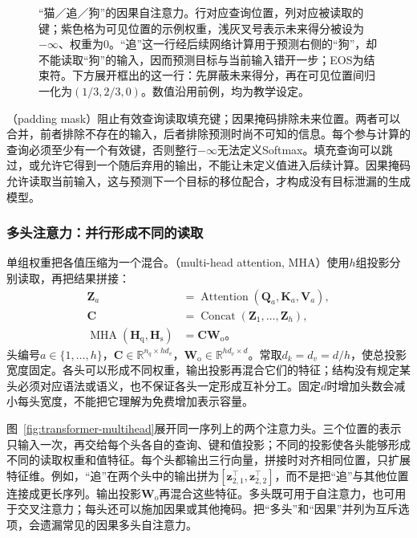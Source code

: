 \begin{figure}[htbp]
  \centering
  
  \caption{“猫／追／狗”的因果自注意力。行对应查询位置，列对应被读取的键；紫色格为可见位置的示例权重，浅灰叉号表示未来得分被设为$-\infty$、权重为0。“追”这一行经后续网络计算用于预测右侧的“狗”，却不能读取“狗”的输入，因而预测目标与当前输入错开一步；EOS为结束符。下方展开框出的这一行：先屏蔽未来得分，再在可见位置间归一化为$(1/3,2/3,0)$。数值沿用前例，均为教学设定。}
  \label{fig:transformer-causal-attention}
\end{figure}
\FloatBarrier
{}（padding mask）阻止有效查询读取填充键；因果掩码排除未来位置。两者可以合并，前者排除不存在的输入，后者排除预测时尚不可知的信息。每个参与计算的查询必须至少有一个有效键，否则整行$-\infty$无法定义Softmax。填充查询可以跳过，或允许它得到一个随后弃用的输出，不能让未定义值进入后续计算。因果掩码允许读取当前输入，这与预测下一个目标的移位配合，才构成没有目标泄漏的生成模型。

\subsubsection{多头注意力：并行形成不同的读取}

单组权重把各值压缩为一个混合。（multi-head attention, MHA）使用$h$组投影分别读取，再把结果拼接：
\begin{equation}
  \begin{aligned}
    \bm Z_a&=\operatorname{Attention}(\bm Q_a,\bm K_a,\bm V_a),\\
    \bm C&=\operatorname{Concat}(\bm Z_1,\ldots,\bm Z_h),\\
    \operatorname{MHA}(\bm H_{\mathrm q},\bm H_{\mathrm s})
      &=\bm C\bm W_{\mathrm o}\text{。}
  \end{aligned}
  \label{eq:transformer-multihead}
\end{equation}
头编号$a\in\{1,\ldots,h\}$，$\bm C\in\mathbb R^{n_q\times hd_v}$，$\bm W_{\mathrm o}\in\mathbb R^{hd_v\times d}$。常取$d_k=d_v=d/h$，使总投影宽度固定。各头可以形成不同权重，输出投影再混合它们的特征；结构没有规定某头必须对应语法或语义，也不保证各头一定形成互补分工。固定$d$时增加头数会减小每头宽度，不能把它理解为免费增加表示容量。

图~\ref{fig:transformer-multihead}展开同一序列上的两个注意力头。三个位置的表示只输入一次，再交给每个头各自的查询、键和值投影；不同的投影使各头能够形成不同的读取权重和值特征。每个头都输出三行向量，拼接时对齐相同位置，只扩展特征维。例如，“追”在两个头中的输出拼为$[\bm z_{2,1}^{\top},\bm z_{2,2}^{\top}]$，而不是把“追”与其他位置连接成更长序列。输出投影$\bm W_{\mathrm o}$再混合这些特征。多头既可用于自注意力，也可用于交叉注意力；每头还可以施加因果或其他掩码。把“多头”和“因果”并列为互斥选项，会遗漏常见的因果多头自注意力。

